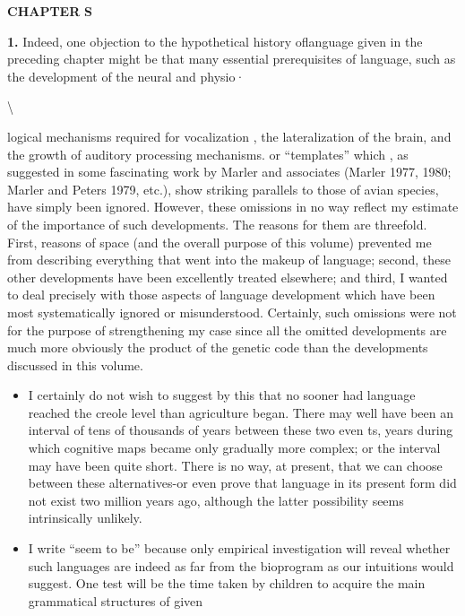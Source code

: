 \begin{itemize}
\begin{itemize}
\begin{itemize}
\begin{itemize}
\begin{itemize}
\begin{itemize}
\begin{itemize}
\textbf{CHAPTER} \textbf{S}

\textbf{1.} Indeed, one objection to the hypothetical history oflanguage given in the preceding chapter might be that many essential prerequi\-sites of language, such as the development of the neural and physio·

{\textbackslash}


logical mechanisms required for vocalization , the lateralization of the brain, and the growth of auditory processing mechanisms. or ``tem\-plates'' which , as suggested in some fascinating work by Marler and associates (Marler 1977, 1980; Marler and Peters 1979, etc.), show striking parallels to those of avian species, have simply been ignored. However, these omissions in no way reflect my estimate of the impor\-tance of such developments. The reasons for them are threefold. First, reasons of space (and the overall purpose of this volume) pre\-vented me from describing everything that went into the makeup of language; second, these other developments have been excellently treated elsewhere; and third, I wanted to deal precisely with those aspects of language development which have been most systematically ignored or misunderstood. Certainly, such omissions were not for the purpose of strengthening my case since all the omitted developments are much more obviously the product of the genetic code than the developments discussed in this volume.

\begin{itemize}
\item I certainly do not wish to suggest by this that no sooner had language reached the creole level than agriculture began. There may well have been an interval of tens of thousands of years between these two even ts, years during which cognitive maps became only gradually more complex; or the interval may have been quite short. There is no way, at present, that we can choose between these alternatives-or even prove that language in its present form did not exist two million years ago, although the latter possibility seems intrinsically unlikely.
\item I write ``seem to be'' because only empirical investigation will reveal whether such languages are indeed as far from the bio\-program as our intuitions would suggest. One test will be the time taken by children to acquire the main grammatical structures of given
\end{itemize}


\end{itemize}
\end{itemize}
\end{itemize}
\end{itemize}
\end{itemize}
\end{itemize}
\end{itemize}
